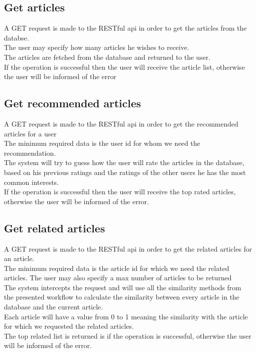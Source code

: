 \subsection{Get articles}
\label{sec:workflow-get-all-articles}
A GET request is made to the RESTful api in order to get the articles from the databse.
\\ The user may specify how many articles he wishes to receive.
\\ The articles are fetched from the database and returned to the user.
\\ If the operation is successful then the user will receive the article list, otherwise the user will be informed of the error

\subsection{Get recommended articles}
\label{sec:workflow-get-recommended-articles}
A GET request is made to the RESTful api in order to get the recommended articles for a user
\\ The minimum required data is the user id for whom we need the recommendation.
\\ The system will try to guess how the user will rate the articles in the database, based on his previous ratings and the ratings of the other users he has the most common interests.
\\ If the operation is successful then the user will receive the top rated articles, otherwise the user will be informed of the error.

\subsection{Get related articles}
\label{sec:workflow-get-related-articles}
A GET request is made to the RESTful api in order to get the related articles for an article.
\\ The minimum required data is the article id for which we need the related articles. The user may also specify a max number of articles to be returned
\\ The system intercepts the request and will use all the similarity methods from the presented workflow to calculate the similarity between every article in the database and the current article.
\\ Each article will have a value from 0 to 1 meaning the similarity with the article for which we requested the related articles.
\\ The top related list is returned is if the operation is successful, otherwise the user will be informed of the error.


